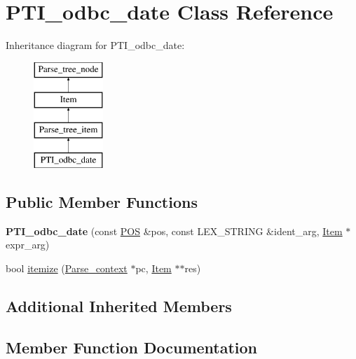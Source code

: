\hypertarget{classPTI__odbc__date}{}\section{P\+T\+I\+\_\+odbc\+\_\+date Class Reference}
\label{classPTI__odbc__date}
Inheritance diagram for P\+T\+I\+\_\+odbc\+\_\+date\+:\begin{figure}[H]
\begin{center}
\leavevmode
\includegraphics[height=4.000000cm]{classPTI__odbc__date}
\end{center}
\end{figure}
\subsection*{Public Member Functions}
\begin{DoxyCompactItemize}
\item 
\mbox{\label{classPTI__odbc__date_a8e25b8f3e5794fe38eb9ccf2ab8cc463}} 
{\bfseries P\+T\+I\+\_\+odbc\+\_\+date} (const \mbox{\hyperlink{structYYLTYPE}{P\+OS}} \&pos, const L\+E\+X\+\_\+\+S\+T\+R\+I\+NG \&ident\+\_\+arg, \mbox{\hyperlink{classItem}{Item}} $\ast$expr\+\_\+arg)
\item 
bool \mbox{\hyperlink{classPTI__odbc__date_a5fb3529a482508f3ef863b49cc31d689}{itemize}} (\mbox{\hyperlink{structParse__context}{Parse\+\_\+context}} $\ast$pc, \mbox{\hyperlink{classItem}{Item}} $\ast$$\ast$res)
\end{DoxyCompactItemize}
\subsection*{Additional Inherited Members}


\subsection{Member Function Documentation}
\mbox{\label{classPTI__odbc__date_a5fb3529a482508f3ef863b49cc31d689}} 
